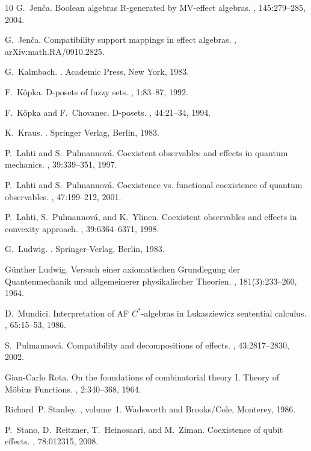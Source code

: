 \documentclass[letterpaper]{amsart}
\theoremstyle{definition}
\begin{document}
\begin{thebibliography}{10}
G.~Jen{\v c}a.
\newblock Boolean algebras {R}-generated by {MV}-effect algebras.
, 145:279--285, 2004.

G.~Jen{\v c}a.
\newblock Compatibility support mappings in effect algebras.
, arXiv:math.RA/0910.2825.

G.~Kalmbach.
.
\newblock Academic Press, New York, 1983.

F.~K{\^o}pka.
\newblock D-posets of fuzzy sets.
, 1:83--87, 1992.

F.~K{\^o}pka and F.~Chovanec.
\newblock D-posets.
, 44:21--34, 1994.

K.~Kraus.
.
\newblock Springer Verlag, Berlin, 1983.

P.~Lahti and S.~Pulmannov{\'a}.
\newblock Coexistent observables and effects in quantum mechanics.
, 39:339--351, 1997.

P.~Lahti and S.~Pulmannov{\'a}.
\newblock Coexistence vs. functional coexistence of quantum observables.
, 47:199--212, 2001.

P.~Lahti, S.~Pulmannov{\'a}, and K.~Ylinen.
\newblock Coexistent observables and effects in convexity approach.
, 39:6364--6371, 1998.

G.~Ludwig.
.
\newblock Springer-Verlag, Berlin, 1983.

G{\"u}nther Ludwig.
\newblock Versuch einer axiomatischen {G}rundlegung der {Q}uantenmechanik und
  allgemeinerer physikalischer {T}heorien.
,
  181(3):233--260, 1964.

D.~Mundici.
\newblock Interpretation of {A}{F} ${C}^*$-algebras in {L}ukasziewicz
  sentential calculus.
, 65:15--53, 1986.

S.~Pulmannov{\'a}.
\newblock Compatibility and decompositions of effects.
, 43:2817--2830, 2002.

Gian-Carlo Rota.
\newblock On the foundations of combinatorial theory {I}. {T}heory of
  {M\"o}bius {F}unctions.
, 2:340--368,
  1964.

Richard~P. Stanley.
, volume~1.
\newblock Wadsworth and Brooks/Cole, Monterey, 1986.

P.~Stano, D.~Reitzner, T.~Heinosaari, and M.~Ziman.
\newblock Coexistence of qubit effects.
, 78:012315, 2008.

\end{thebibliography}
\end{document}
